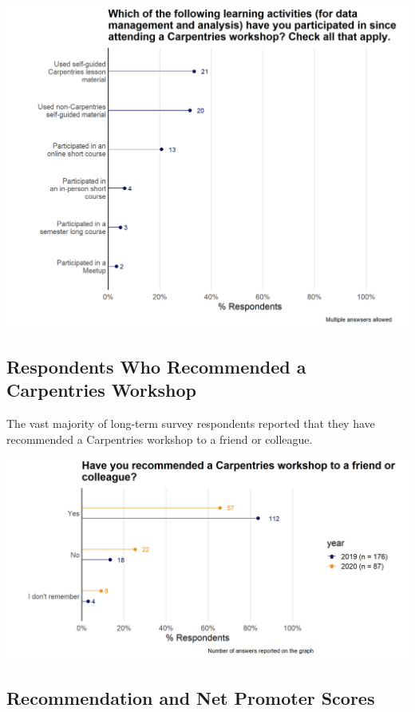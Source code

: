 \documentclass[
]{article}
\makeatletter
\def\maxwidth{\ifdim\Gin@nat@width>\linewidth\linewidth\else\Gin@nat@width\fi}
\makeatother
\begin{document}
\includegraphics[width=\maxwidth]{../figures/2020-12-longterm-other_activities-1}

\hypertarget{respondents-who-recommended-a-carpentries-workshop}{%
\subsection{Respondents Who Recommended a Carpentries
Workshop}\label{respondents-who-recommended-a-carpentries-workshop}}

The vast majority of long-term survey respondents reported that they
have recommended a Carpentries workshop to a friend or colleague.

\includegraphics[width=\maxwidth]{../figures/2020-12-longterm-has_recommended-1}

\hypertarget{recommendation-and-net-promoter-scores}{%
\subsection{Recommendation and Net Promoter
Scores}\label{recommendation-and-net-promoter-scores}}
\end{document}
